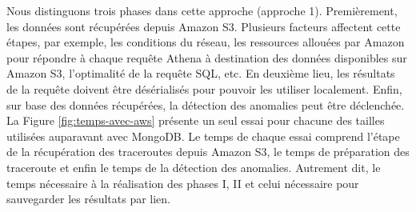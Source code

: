 Nous distinguons trois phases dans cette approche (approche 1). Premièrement,  les données sont récupérées depuis Amazon S3. Plusieurs facteurs affectent cette étapes, par exemple,  les conditions du réseau, les ressources allouées par Amazon pour répondre à chaque requête  Athena à destination des données disponibles sur Amazon S3, l'optimalité de la requête SQL, etc.  En deuxième lieu, les résultats de la requête doivent être désérialisés pour pouvoir les utiliser localement. Enfin, sur base des données récupérées, la détection des anomalies peut être déclenchée.
%
%
%	
%		
La Figure \ref{fig:temps-avec-aws} présente un seul essai pour chacune des tailles utilisées auparavant avec MongoDB.  Le temps de chaque essai comprend l'étape de la récupération des traceroutes depuis Amazon S3, le temps de préparation des traceroute et enfin le temps de la détection des anomalies. Autrement dit, le temps nécessaire à la réalisation des phases I, II et celui nécessaire pour sauvegarder les résultats par lien.


